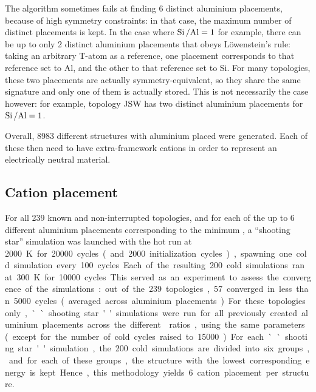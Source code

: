 \documentclass[main.tex]{subfiles}
\begin{document}
The algorithm sometimes fails at finding 6 distinct aluminium placements, because of high symmetry constraints: in that case, the maximum number of distinct placements is kept.%
In the case where $\mbox{Si\,/Al} = 1$ for example, there can be up to only 2 distinct aluminium placements that obeys L\"owenstein's rule: taking an arbitrary T-atom as a reference, one placement corresponds to that reference set to Al, and the other to that reference set to Si. For many topologies, these two placements are actually symmetry-equivalent, so they share the same signature and only one of them is actually stored. This is not necessarily the case however: for example, topology JSW has two distinct aluminium placements for $\mbox{Si\,/Al} = 1$.

Overall, \num{8983} different structures with aluminium placed were generated. Each of these then need to have extra-framework cations in order to represent an electrically neutral material.

\subsection{Cation placement}

For all 239 known and non-interrupted topologies, and for each of the up to 6 different aluminium placements corresponding to the minimum \SiAl, a ``shooting star'' simulation was launched with the hot run at \qty{2000}K for \num{20000} cycles (and \num{2000} initialization cycles), spawning one cold simulation every \num{100} cycles. Each of the resulting \num{200} cold simulations ran at \qty{300}K for \num{10000} cycles. This served as an experiment to assess the convergence of the simulations: out of the 239 topologies, 57 converged in less than \num{5000} cycles (averaged across aluminium placements). For these topologies only, ``shooting star'' simulations were run for all previously created aluminium placements across the different \SiAl ratios, using the same parameters (except for the number of cold cycles raised to \num{15000}). For each ``shooting star'' simulation, the \num{200} cold simulations are divided into six groups, and for each of these groups, the structure with the lowest corresponding energy is kept. Hence, this methodology yields 6 cation placement per structure.
\end{document}

